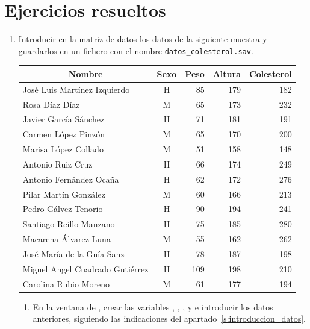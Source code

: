 \section{Ejercicios resueltos}
\begin{enumerate}[leftmargin=*]
\item Introducir en la matriz de datos los datos de la siguiente muestra y guardarlos en un fichero con el nombre \texttt{datos\_colesterol.sav}.
\begin{center}
\begin{tabular}{|l|c|r|r|r|}
\hline
\multicolumn{1}{|c|}{Nombre} & \multicolumn{1}{c|}{Sexo} & \multicolumn{1}{c|}{Peso} & \multicolumn{1}{c|}{Altura} & \multicolumn{1}{c|}{Colesterol}\\
\hline
José Luis Martínez Izquierdo  & H &  85 & 179 & 182\\
Rosa Díaz Díaz & M & 65 & 173 & 232\\
Javier García Sánchez  & H & 71 & 181 & 191\\
Carmen López Pinzón & M &  65 & 170 & 200\\
Marisa López Collado & M &  51 & 158 & 148\\
Antonio Ruiz Cruz & H & 66 & 174 & 249\\
Antonio Fernández Ocaña & H &  62 & 172 & 276\\
Pilar Martín González & M &  60 & 166 & 213\\
Pedro Gálvez Tenorio & H &  90 & 194 & 241\\
Santiago Reillo Manzano & H &  75 & 185 & 280\\
Macarena Álvarez Luna & M &  55 & 162 & 262\\
José María de la Guía Sanz & H &  78 & 187 & 198\\
Miguel Angel Cuadrado Gutiérrez & H &  109  & 198 & 210\\
Carolina Rubio Moreno & M &  61 & 177 & 194\\
\hline
\end{tabular}
\end{center}


\begin{indicacion}
\begin{enumerate}
\item En la ventana de , crear las variables , ,  ,  y  e introducir los datos anteriores, siguiendo las indicaciones del apartado~\ref{s:introduccion_datos}.


\end{enumerate}
\end{indicacion}
\end{enumerate}
